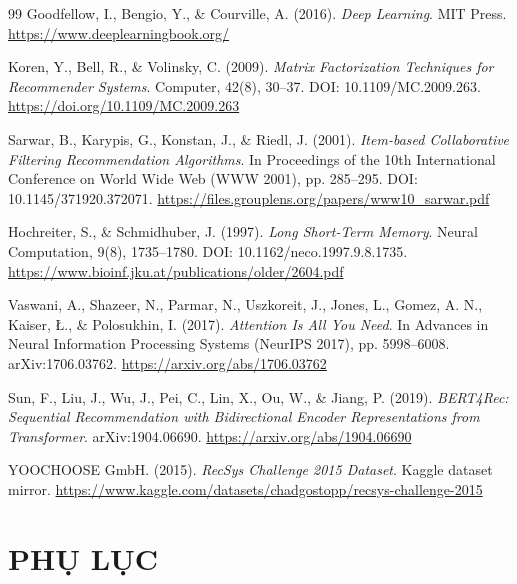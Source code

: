 \documentclass[12pt, a4paper]{article}
\begin{document}
\begin{thebibliography}{99}
Goodfellow, I., Bengio, Y., \& Courville, A. (2016).
\textit{Deep Learning}.
MIT Press. \url{https://www.deeplearningbook.org/}

Koren, Y., Bell, R., \& Volinsky, C. (2009).
\textit{Matrix Factorization Techniques for Recommender Systems}.
Computer, 42(8), 30--37. DOI: 10.1109/MC.2009.263. \url{https://doi.org/10.1109/MC.2009.263}

Sarwar, B., Karypis, G., Konstan, J., \& Riedl, J. (2001).
\textit{Item-based Collaborative Filtering Recommendation Algorithms}.
In Proceedings of the 10th International Conference on World Wide Web (WWW 2001), pp. 285--295. DOI: 10.1145/371920.372071. \url{https://files.grouplens.org/papers/www10_sarwar.pdf}

Hochreiter, S., \& Schmidhuber, J. (1997).
\textit{Long Short-Term Memory}.
Neural Computation, 9(8), 1735--1780. DOI: 10.1162/neco.1997.9.8.1735. \url{https://www.bioinf.jku.at/publications/older/2604.pdf}

Vaswani, A., Shazeer, N., Parmar, N., Uszkoreit, J., Jones, L., Gomez, A. N., Kaiser, Ł., \& Polosukhin, I. (2017).
\textit{Attention Is All You Need}.
In Advances in Neural Information Processing Systems (NeurIPS 2017), pp. 5998--6008. arXiv:1706.03762. \url{https://arxiv.org/abs/1706.03762}

Sun, F., Liu, J., Wu, J., Pei, C., Lin, X., Ou, W., \& Jiang, P. (2019).
\textit{BERT4Rec: Sequential Recommendation with Bidirectional Encoder Representations from Transformer}.
arXiv:1904.06690. \url{https://arxiv.org/abs/1904.06690}

YOOCHOOSE GmbH. (2015).
\textit{RecSys Challenge 2015 Dataset}.
Kaggle dataset mirror. \url{https://www.kaggle.com/datasets/chadgostopp/recsys-challenge-2015}

\end{thebibliography}

\newpage


\appendix
\setcounter{table}{0}
\setcounter{lstlisting}{0}
\renewcommand{\thetable}{P.\arabic{table}}
\renewcommand{\thelstlisting}{P.\arabic{lstlisting}}
\lstset{basicstyle=\ttfamily\footnotesize}
\section*{PHỤ LỤC}
\end{document}
